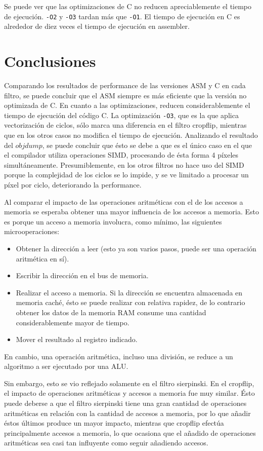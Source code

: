 \documentclass[a4paper]{article}
\begin{document}
\smallskip
Se puede ver que las optimizaciones de C no reducen apreciablemente el tiempo de ejecución. \texttt{-O2} y \texttt{-O3} tardan más que \texttt{-O1}. El tiempo de ejecución en C es alrededor de diez veces el tiempo de ejecución en assembler.


\section{Conclusiones}

Comparando los resultados de performance de las versiones ASM y C en cada filtro, se puede concluir que el ASM siempre es más eficiente que la versión no optimizada de C. En cuanto a las optimizaciones, reducen considerablemente el tiempo de ejecución del código C. La optimización \texttt{-O3}, que es la que aplica vectorización de ciclos, sólo marca una diferencia en el filtro cropflip, mientras que en los otros casos no modifica el tiempo de ejecución. Analizando el resultado del $objdump$, se puede concluir que ésto se debe a que es el único caso en el que el compilador utiliza operaciones SIMD, procesando de ésta forma 4 píxeles simultáneamente. Presumiblemente, en los otros filtros no hace uso del SIMD porque la complejidad de los ciclos se lo impide, y se ve limitado a procesar un píxel por ciclo, deteriorando la performance.

Al comparar el impacto de las operaciones aritméticas con el de los accesos a memoria se esperaba obtener una mayor influencia de los accesos a memoria. Esto es porque un acceso a memoria involucra, como mínimo, las siguientes microoperaciones:
\begin{itemize}
\item Obtener la dirección a leer (esto ya son varios pasos, puede ser una operación aritmética en sí).
\item Escribir la dirección en el bus de memoria.
\item Realizar el acceso a memoria. Si la dirección se encuentra almacenada en memoria caché, ésto se puede realizar con relativa rapidez, de lo contrario obtener los datos de la memoria RAM consume una cantidad considerablemente mayor de tiempo.
\item Mover el resultado al registro indicado.
\end{itemize}
En cambio, una operación aritmética, incluso una división, se reduce a un algoritmo a ser ejecutado por una ALU. 

Sin embargo, esto se vio reflejado solamente en el filtro sierpinski. En el cropflip, el impacto de operaciones aritméticas y accesos a memoria fue muy similar. Ésto puede deberse a que el filtro sierpinski tiene una gran cantidad de operaciones aritméticas en relación con la cantidad de accesos a memoria, por lo que añadir éstos últimos produce un mayor impacto, mientras que cropflip efectúa principalmente accesos a memoria, lo que ocasiona que el añadido de operaciones aritméticas sea casi tan influyente como seguir añadiendo accesos.
\end{document}
